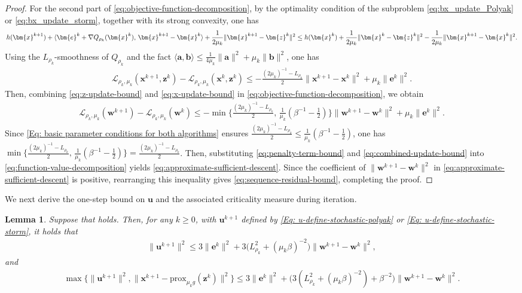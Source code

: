\documentclass{article}
\theoremstyle{plain}
\newtheorem{lemma}{Lemma}[section]
\theoremstyle{definition}
\theoremstyle{remark}
\newcommand{\prox}{\mathrm{prox}}
\newcommand{\bx}{\bm{x}}
\newcommand{\bb}{\bm{b}}
\newcommand{\be}{\bm{e}}
\newcommand{\bu}{\bm{u}}
\newcommand{\bz}{\bm{z}}
\newcommand{\ba}{\bm{a}}
\newcommand{\calL}{\mathcal{L}}
\newcommand{\bw}{\bm{w}}
\numberwithin{equation}{section}
\begin{document}
\begin{proof}
For the second part of \eqref{eq:objective-function-decomposition}, by the optimality condition of the subproblem \eqref{eq:bx_update_Polyak} or \eqref{eq:bx_update_storm}, together with its strong convexity, one has
\begin{align}
h(\bx^{k+1})
+ \langle \be^{k} + \nabla Q_{\rho_k}(\bx^{k}),\, \bx^{k+1}-\bx^{k}\rangle
   + \frac{1}{2\mu_k}\|\bx^{k+1}-\bz^{k}\|^{2} \le h(\bx^{k}) + \frac{1}{2\mu_k}\|\bx^{k}-\bz^{k}\|^{2}
   - \frac{1}{2\mu_k}\|\bx^{k+1}-\bx^{k}\|^{2}. \notag
\end{align}
Using the $L_{\rho_k}$-smoothness of $Q_{\rho_k}$ and the fact
$\langle \ba,\bb\rangle \le \tfrac{1}{4\mu_k}\|\ba\|^{2}+ \mu_k\|\bb\|^{2}$, one has
\begin{align}
\calL_{\rho_k,\mu_k}(\bx^{k+1},\bz^{k})
 - \calL_{\rho_k,\mu_k}(\bx^{k},\bz^{k})
\le -\frac{(2\mu_k)^{-1}- L_{\rho_k}}{2}\|\bx^{k+1}-\bx^{k}\|^{2}
+ \mu_k\|\be^{k}\|^{2}.
\label{eq:x-update-bound}
\end{align}
Then, combining \eqref{eq:z-update-bound} and \eqref{eq:x-update-bound} in
\eqref{eq:objective-function-decomposition}, we obtain
\begin{align}
\calL_{\rho_k,\mu_k}(\bw^{k+1}) - \calL_{\rho_k,\mu_k}(\bw^{k})
\le  - \min\{\frac{(2\mu_k)^{-1}-L_{\rho_k}}{2},\,
\frac{1}{\mu_k}(\beta^{-1}-\tfrac{1}{2})\}
\|\bw^{k+1}-\bw^{k}\|^{2}  + \mu_k\|\be^{k}\|^{2}.
\label{eq:combined-update-bound}
\end{align}
Since \eqref{Eq: basic parameter conditions for both algorithms} ensures $\frac{(2\mu_k)^{-1} - L_{\rho_k}}{2} \le \frac{1}{\mu_k}(\beta^{-1}-\tfrac{1}{2})$, one has \( \min\{\frac{(2\mu_k)^{-1}-L_{\rho_k}}{2},\,
\frac{1}{\mu_k}(\beta^{-1}-\tfrac{1}{2})\} = \frac{(2\mu_k)^{-1}-L_{\rho_k}}{2}\). Then, substituting \eqref{eq:penalty-term-bound} and \eqref{eq:combined-update-bound} into
\eqref{eq:function-value-decomposition} yields \eqref{eq:approximate-sufficient-descent}. Since the coefficient of $\| \bw^{k+1}- \bw^{k}\|^{2}$ in \eqref{eq:approximate-sufficient-descent} is positive, rearranging this inequality gives \eqref{eq:sequence-residual-bound}, completing the proof.
\end{proof}
We next derive the one-step bound on \(\bu\) and the associated criticality measure during iteration.
\begin{lemma}
    \label{Lemma: criticality-stationarity-measure} Suppose that  holds.
    Then, for any
    $k \geq 0$, with $\bu^{k+1}$ defined by \eqref{Eq: u-define-stochastic-polyak} or \eqref{Eq: u-define-stochastic-storm}, it holds
    that
    \begin{align}
        \label{Eq: the boundedness of subgradient}\| \bu^{k+1}\|^{2}\leq 3\| \be^{k}\|^{2}+ 3\bigl( L_{\rho_k}^{2}+ (\mu_{k}\beta)^{-2}\bigr) \| \bw^{k+1}- \bw^{k}\|^{2},
    \end{align}
and
    \begin{align}
    \label{Eq: the criticality measure}\max\{\| \bu^{k+1}\|^{2}, \| \bx^{k+1}- \prox_{\mu_k g}(\bz^{k})\|^{2}\}
        \le  3\| \be^{k}\|^{2}+ \bigl(3 \left(L_{\rho_k}^{2}+ (\mu_{k}\beta)^{-2}\right) + \beta^{-2}\bigr) \| \bw^{k+1}- \bw^{k}\|^{2}.
    \end{align}
\end{lemma}
\end{document}
